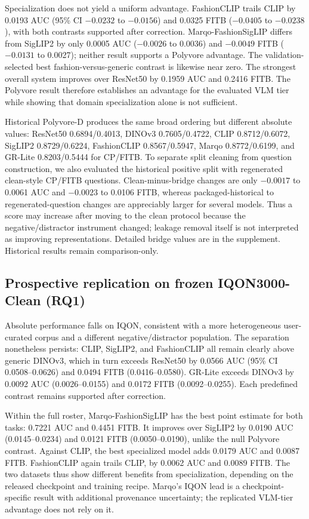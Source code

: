 \documentclass[preprint,12pt]{elsarticle}
\begin{document}
Specialization does not yield a uniform advantage. FashionCLIP trails CLIP by 0.0193 AUC (95\% CI $-0.0232$ to $-0.0156$) and 0.0325 FITB ($-0.0405$ to $-0.0238$), with both contrasts supported after correction. Marqo-FashionSigLIP differs from SigLIP2 by only 0.0005 AUC ($-0.0026$ to 0.0036) and $-0.0049$ FITB ($-0.0131$ to 0.0027); neither result supports a Polyvore advantage. The validation-selected best fashion-versus-generic contrast is likewise near zero. The strongest overall system improves over ResNet50 by 0.1959 AUC and 0.2416 FITB. The Polyvore result therefore establishes an advantage for the evaluated VLM tier while showing that domain specialization alone is not sufficient.

Historical Polyvore-D produces the same broad ordering but different absolute values: ResNet50 0.6894/0.4013, DINOv3 0.7605/0.4722, CLIP 0.8712/0.6072, SigLIP2 0.8729/0.6224, FashionCLIP 0.8567/0.5947, Marqo 0.8772/0.6199, and GR-Lite 0.8203/0.5444 for CP/FITB. To separate split cleaning from question construction, we also evaluated the historical positive split with regenerated clean-style CP/FITB questions. Clean-minus-bridge changes are only $-0.0017$ to 0.0061 AUC and $-0.0023$ to 0.0106 FITB, whereas packaged-historical to regenerated-question changes are appreciably larger for several models. Thus a score may increase after moving to the clean protocol because the negative/distractor instrument changed; leakage removal itself is not interpreted as improving representations. Detailed bridge values are in the supplement. Historical results remain comparison-only.

\subsection{Prospective replication on frozen IQON3000-Clean (RQ1)}\label{sec:iqon}

Absolute performance falls on IQON, consistent with a more heterogeneous user-curated corpus and a different negative/distractor population. The separation nonetheless persists: CLIP, SigLIP2, and FashionCLIP all remain clearly above generic DINOv3, which in turn exceeds ResNet50 by 0.0566 AUC (95\% CI 0.0508--0.0626) and 0.0494 FITB (0.0416--0.0580). GR-Lite exceeds DINOv3 by 0.0092 AUC (0.0026--0.0155) and 0.0172 FITB (0.0092--0.0255). Each predefined contrast remains supported after correction.

Within the full roster, Marqo-FashionSigLIP has the best point estimate for both tasks: 0.7221 AUC and 0.4451 FITB. It improves over SigLIP2 by 0.0190 AUC (0.0145--0.0234) and 0.0121 FITB (0.0050--0.0190), unlike the null Polyvore contrast. Against CLIP, the best specialized model adds 0.0179 AUC and 0.0087 FITB. FashionCLIP again trails CLIP, by 0.0062 AUC and 0.0089 FITB. The two datasets thus show different benefits from specialization, depending on the released checkpoint and training recipe. Marqo's IQON lead is a checkpoint-specific result with additional provenance uncertainty; the replicated VLM-tier advantage does not rely on it.
\end{document}
